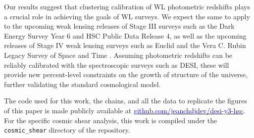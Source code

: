 Our results suggest that clustering calibration of 
WL photometric redshifts plays a crucial role in achieving the 
goals of WL surveys. We expect the same to 
apply to the 
upcoming weak lensing releases of Stage III surveys such as the Dark Energy Survey Year 6 and HSC Public Data Release 4, as well as the upcoming releases of Stage IV weak lensing surveys such as Euclid \cite{EuclidI2024overview} and the Vera C. Rubin Legacy Survey of Space and Time \cite{LSST2019survey}. Assuming photometric 
redshifts can be reliably calibrated with the spectroscopic surveys such as DESI, these will provide new percent-level constraints on the growth of structure of the universe, further validating the standard cosmological model.


The code used for this work, the chains, and all the data to replicate the figures of this paper is made publicly available at \href{https://github.com/JeanCHDJdev/desi-y3-hsc/}{\textcolor{blue}{github.com/jeanchdjdev/desi-y3-hsc}}. For the specific cosmic shear analysis, this work is compiled under the \texttt{cosmic\_shear} directory of the repository.

